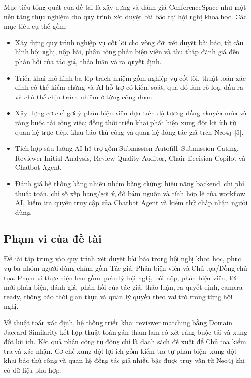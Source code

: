 \documentclass[12pt,a4paper]{article}
\begin{document}
Mục tiêu tổng quát của đề tài là xây dựng và đánh giá ConferenceSpace như một nền tảng thực nghiệm cho quy trình xét duyệt bài báo tại hội nghị khoa học. Các mục tiêu cụ thể gồm:

\begin{itemize}[label=--,leftmargin=2.2em,itemsep=0.15\baselineskip,topsep=0.2\baselineskip]
  \item Xây dựng quy trình nghiệp vụ cốt lõi cho vòng đời xét duyệt bài báo, từ cấu hình hội nghị, nộp bài, phân công phản biện viên và thu thập đánh giá đến phản hồi của tác giả, thảo luận và ra quyết định.
  \item Triển khai mô hình ba lớp trách nhiệm gồm nghiệp vụ cốt lõi, thuật toán xác định có thể kiểm chứng và AI hỗ trợ có kiểm soát, qua đó làm rõ loại đầu ra và chủ thể chịu trách nhiệm ở từng công đoạn.
  \item Xây dựng cơ chế gợi ý phản biện viên dựa trên độ tương đồng chuyên môn và ràng buộc tải công việc; đồng thời triển khai phát hiện xung đột lợi ích từ quan hệ trực tiếp, khai báo thủ công và quan hệ đồng tác giả trên Neo4j~[5].
  \item Tích hợp sáu luồng AI hỗ trợ gồm Submission Autofill, Submission Gating, Reviewer Initial Analysis, Review Quality Auditor, Chair Decision Copilot và Chatbot Agent.
  \item Đánh giá hệ thống bằng nhiều nhóm bằng chứng: hiệu năng backend, chi phí thuật toán, chỉ số xếp hạng/gợi ý, độ bám nguồn và tính hợp lệ của workflow AI, kiểm tra quyền truy cập của Chatbot Agent và kiểm thử chấp nhận người dùng.
\end{itemize}

\subsection{Phạm vi của đề tài}
\justifying

Đề tài tập trung vào quy trình xét duyệt bài báo trong hội nghị khoa học, phục vụ ba nhóm người dùng chính gồm Tác giả, Phản biện viên và Chủ tọa/Đồng chủ tọa. Phạm vi thực hiện bao gồm quản lý hội nghị, bài nộp, phản biện viên, lời mời phản biện, đánh giá, phản hồi của tác giả, thảo luận, ra quyết định, camera-ready, thông báo thời gian thực và quản lý quyền theo vai trò trong từng hội nghị.

Về thuật toán xác định, hệ thống triển khai reviewer matching bằng Domain Jaccard Similarity kết hợp thuật toán gán tham lam có xét ràng buộc tải và xung đột lợi ích. Kết quả phân công tự động chỉ là danh sách đề xuất để Chủ tọa kiểm tra và xác nhận. Cơ chế xung đột lợi ích gồm kiểm tra tự phản biện, xung đột khai báo thủ công và quan hệ đồng tác giả nhiều bậc được truy vấn từ Neo4j khi có dữ liệu phù hợp.
\end{document}
